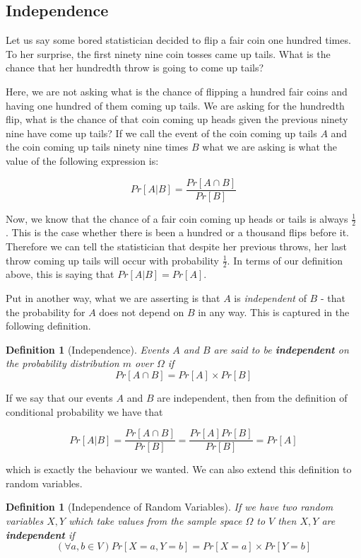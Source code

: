 \documentclass[12pt,a4paper]{article}
\newtheorem{definition}[theorem]{Definition}
\begin{document}
\subsection{Independence}

Let us say some bored statistician decided to flip a fair coin one hundred times.
To her surprise, the first ninety nine coin tosses came up tails. What is the
chance that her hundredth throw is going to come up tails? 

Here, we are not asking what is the chance of flipping a hundred fair coins and having
one hundred of them coming up tails. We are asking for the hundredth flip,
what is the chance of that coin coming up heads given the previous ninety nine
have come up tails? If we call the event of the coin coming up tails
$A$ and the coin coming up tails ninety nine times $B$ what we are asking is
what the value of the following expression is:

\[Pr[A|B] = \frac{Pr[A \cap B]}{Pr[B]}\]

Now, we know that the chance of a fair coin coming up heads or tails is always
$\frac{1}{2}$ . This is the case whether there is been a hundred or a thousand
flips before it. Therefore we can tell the statistician that despite her
previous throws, her last throw coming up tails will occur with probability
$\frac{1}{2}$. In terms of our definition above, this is saying that $Pr[A|B] =
Pr[A]$.

Put in another way, what we are asserting is that $A$ is \textit{independent} of
$B$ - that the probability for $A$ does not depend on $B$ in any way. This is
captured in the following definition.

\begin{definition}[Independence]
Events $A$ and $B$ are said to be \textbf{independent} on the probability distribution
$m$ over $\Omega$ if
\[Pr[A \cap B] = Pr[A] \times Pr[B] \]
\end{definition}
If we say that our events $A$ and $B$ are independent, then from the
definition of conditional probability we have that 

\[Pr[A|B] = \frac{Pr[A \cap B]}{Pr[B]} = \frac{Pr[A] Pr[B]}{Pr[B]} = Pr[A] \]

which is exactly the behaviour we wanted. We can also extend this definition to
random variables.

\begin{definition}[Independence of Random Variables]
If we have two random variables $X,Y$ which take values from the sample space
$\Omega$ to $V$ then $X,Y$ are \textbf{independent} if 
\[(\forall a,b \in V) Pr[X=a, Y=b] = Pr[X=a] \times Pr[Y=b]\]
\end{definition}
\end{document}
